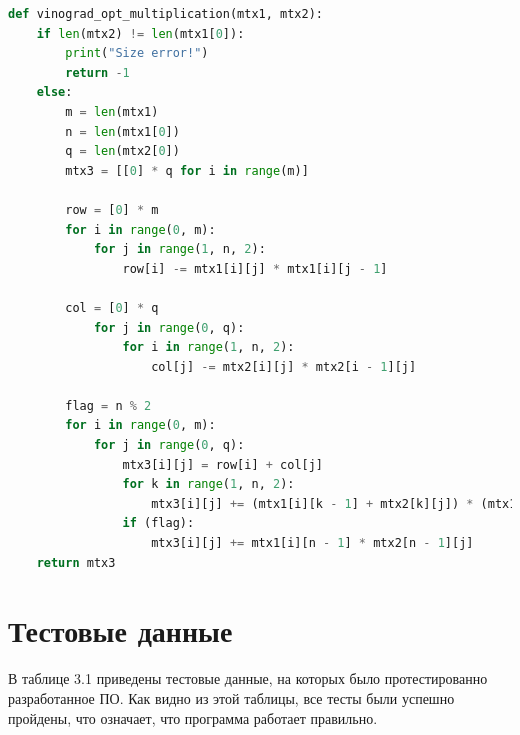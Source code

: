 \documentclass[12pt]{report}
\begin{document}
\newpage

\begin{lstlisting}[label=some-code,caption=Функция умножения матриц с помощью оптимизированного аглоритма Винограда,language=Python]
def vinograd_opt_multiplication(mtx1, mtx2):
	if len(mtx2) != len(mtx1[0]):
		print("Size error!")
		return -1
	else:
		m = len(mtx1)
		n = len(mtx1[0])
		q = len(mtx2[0])
		mtx3 = [[0] * q for i in range(m)]
		
		row = [0] * m
		for i in range(0, m):
			for j in range(1, n, 2):
				row[i] -= mtx1[i][j] * mtx1[i][j - 1]
		
		col = [0] * q
			for j in range(0, q):
				for i in range(1, n, 2):
					col[j] -= mtx2[i][j] * mtx2[i - 1][j]
		
		flag = n % 2
		for i in range(0, m):
			for j in range(0, q):
				mtx3[i][j] = row[i] + col[j]
				for k in range(1, n, 2):
					mtx3[i][j] += (mtx1[i][k - 1] + mtx2[k][j]) * (mtx1[i][k] + mtx2[k - 1][j])
				if (flag):
					mtx3[i][j] += mtx1[i][n - 1] * mtx2[n - 1][j]
	return mtx3
\end{lstlisting}

\section{Тестовые данные}

В таблице 3.1 приведены тестовые данные, на которых было протестированно разработанное ПО. Как видно из этой таблицы, все тесты были успешно пройдены, что означает, что программа работает правильно.
\end{document}
